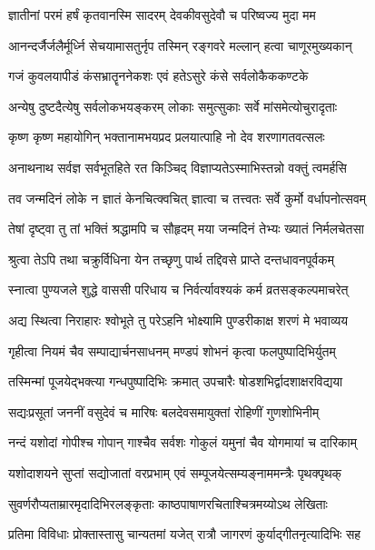 \twolineshloka
{ज्ञातीनां परमं हर्षं कृतवानस्मि सादरम्}
{देवकीवसुदेवौ च परिष्वज्य मुदा मम}%

\twolineshloka
{आनन्दर्जैर्जलैर्मूर्ध्नि सेचयामासतुर्नृप}
{तस्मिन् रङ्गवरे मल्लान् हत्वा चाणूरमुख्यकान्}%

\twolineshloka
{गजं कुवलयापीडं कंसभ्रातॄननेकशः}
{एवं हतेऽसुरे कंसे सर्वलोकैककण्टके}%

\twolineshloka
{अन्येषु दुष्टदैत्येषु सर्वलोकभयङ्करम्}
{लोकाः समुत्सुकाः सर्वे मांसमेत्योचुरादृताः}%

\twolineshloka
{कृष्ण कृष्ण महायोगिन् भक्तानामभयप्रद}
{प्रलयात्पाहि नो देव शरणागतवत्सलः}%

\twolineshloka
{अनाथनाथ सर्वज्ञ सर्वभूतहिते रत}
{किञ्चिद् विज्ञाप्यतेऽस्माभिस्तन्नो वक्तुं त्वमर्हसि}%

\twolineshloka
{तव जन्मदिनं लोके न ज्ञातं केनचित्क्वचित्}
{ज्ञात्वा च तत्त्वतः सर्वे कुर्मो वर्धापनोत्सवम्}%

\twolineshloka
{तेषां दृष्ट्वा तु तां भक्तिं श्रद्धामपि च सौहृदम्}
{मया जन्मदिनं तेभ्यः ख्यातं निर्मलचेतसा}%

\twolineshloka
{श्रुत्वा तेऽपि तथा चक्रुर्विधिना येन तच्छृणु}
{पार्थ तद्दिवसे प्राप्ते दन्तधावनपूर्वकम्}%

\twolineshloka
{स्नात्वा पुण्यजले शुद्धे वाससी परिधाय च}
{निर्वर्त्यावश्यकं कर्म व्रतसङ्कल्पमाचरेत्}%

\twolineshloka
{अद्य स्थित्वा निराहारः श्वोभूते तु परेऽहनि}
{भोक्ष्यामि पुण्डरीकाक्ष शरणं मे भवाव्यय}%

\twolineshloka
{गृहीत्वा नियमं चैव सम्पाद्यार्चनसाधनम्}
{मण्डपं शोभनं कृत्वा फलपुष्पादिभिर्युतम्}%

\twolineshloka
{तस्मिन्मां पूजयेद्भक्त्या गन्धपुष्पादिभिः क्रमात्}
{उपचारैः षोडशभिर्द्वादशाक्षरविद्यया}%

\twolineshloka
{सद्यःप्रसूतां जननीं वसुदेवं च मारिषः}
{बलदेवसमायुक्तां रोहिणीं गुणशोभिनीम्}%

\twolineshloka
{नन्दं यशोदां गोपीश्च गोपान् गाश्चैव सर्वशः}
{गोकुलं यमुनां चैव योगमायां च दारिकाम्}%

\twolineshloka
{यशोदाशयने सुप्तां सद्योजातां वरप्रभाम्}
{एवं सम्पूजयेत्सम्यङ्नाममन्त्रैः पृथक्पृथक्}%

\twolineshloka
{सुवर्णरौप्यताम्रारमृदादिभिरलङ्कृताः}
{काष्ठपाषाणरचिताश्चित्रमय्योऽथ लेखिताः}%

\twolineshloka
{प्रतिमा विविधाः प्रोक्तास्तासु चान्यतमां यजेत्}
{रात्रौ जागरणं कुर्याद्गीतनृत्यादिभिः सह}%

